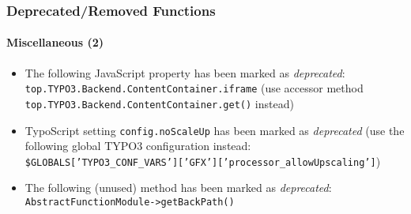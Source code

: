 \begin{frame}[fragile]
	\frametitle{Deprecated/Removed Functions}
	\framesubtitle{Miscellaneous (2)}


	\begin{itemize}

		\item The following JavaScript property has been marked as \textit{deprecated}:\newline
			\texttt{top.TYPO3.Backend.ContentContainer.iframe}\newline
			\smaller
				(use accessor method \texttt{top.TYPO3.Backend.ContentContainer.get()} instead)
			\normalsize

		\item TypoScript setting \texttt{config.noScaleUp} has been marked as \textit{deprecated}\newline
			\smaller
				(use the following global TYPO3 configuration instead:\newline
				\texttt{\$GLOBALS['TYPO3\_CONF\_VARS']['GFX']['processor\_allowUpscaling']})
			\normalsize

		\item The following (unused) method has been marked as \textit{deprecated}:\newline
			\texttt{AbstractFunctionModule->getBackPath()}

	\end{itemize}

\end{frame}






